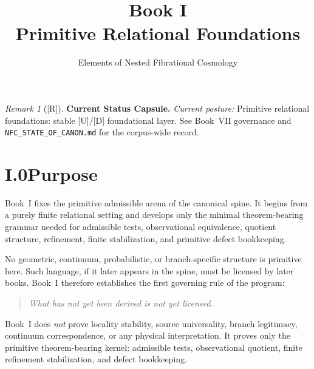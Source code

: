 \documentclass[12pt,oneside]{amsbook}
\theoremstyle{plain}
\theoremstyle{definition}
\theoremstyle{remark}
\newtheorem{remark}[theorem]{Remark}
\newcommand{\status}[1]{\textup{[#1]}}
\begin{document}
\title{Book I\\[6pt]Primitive Relational Foundations}
\author{Elements of Nested Fibrational Cosmology}
\date{}
\maketitle

\tableofcontents

\bigskip


\begin{remark}[\status{R}]\label{cap:book1-status}
\textbf{Current Status Capsule.} \emph{Current posture:} Primitive relational foundations: stable [U]/[D] foundational layer. See Book~VII governance and \texttt{NFC\_STATE\_OF\_CANON.md} for the corpus-wide record.
\end{remark}

\section*{I.0\quad Purpose}

Book~I fixes the primitive admissible arena of the canonical spine.
It begins from a purely finite relational setting and develops only
the minimal theorem-bearing grammar needed for admissible tests,
observational equivalence, quotient structure, refinement, finite
stabilization, and primitive defect bookkeeping.

No geometric, continuum, probabilistic, or branch-specific structure
is primitive here.  Such language, if it later appears in the spine,
must be licensed by later books.  Book~I therefore establishes the
first governing rule of the program:

\begin{quote}
\textit{What has not yet been derived is not yet licensed.}
\end{quote}

\noindent
Book~I does \emph{not} prove locality stability, source universality,
branch legitimacy, continuum correspondence, or any physical
interpretation.  It proves only the primitive theorem-bearing kernel:
admissible tests, observational quotient, finite refinement
stabilization, and defect bookkeeping.
\end{document}
